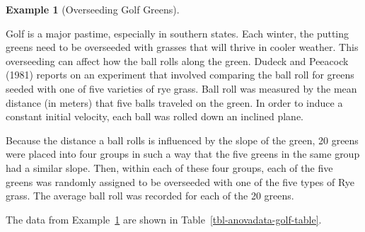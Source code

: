 \documentclass[
  letterpaper,
  DIV=11,
  numbers=noendperiod]{scrreprt}
\theoremstyle{definition}
\theoremstyle{definition}
\newtheorem{example}{Example}[chapter]
\theoremstyle{plain}
\theoremstyle{remark}
\begin{document}
\begin{example}[Overseeding Golf
Greens]\protect\hypertarget{exm-anovadata-golf}{}\label{exm-anovadata-golf}

Golf is a major pastime, especially in southern states. Each winter, the
putting greens need to be overseeded with grasses that will thrive in
cooler weather. This overseeding can affect how the ball rolls along the
green. Dudeck and Peeacock (1981) reports on an experiment that involved
comparing the ball roll for greens seeded with one of five varieties of
rye grass. Ball roll was measured by the mean distance (in meters) that
five balls traveled on the green. In order to induce a constant initial
velocity, each ball was rolled down an inclined plane.

Because the distance a ball rolls is influenced by the slope of the
green, 20 greens were placed into four groups in such a way that the
five greens in the same group had a similar slope. Then, within each of
these four groups, each of the five greens was randomly assigned to be
overseeded with one of the five types of Rye grass. The average ball
roll was recorded for each of the 20 greens.

\end{example}

The data from Example~\ref{exm-anovadata-golf} are shown in
Table~\ref{tbl-anovadata-golf-table}.
\end{document}
